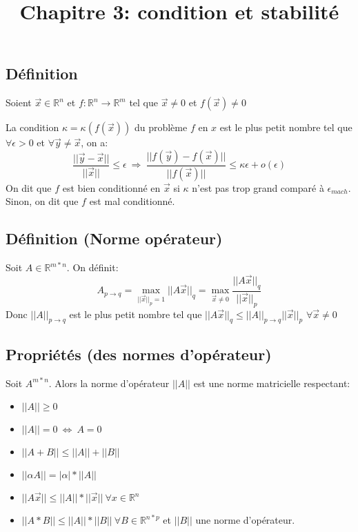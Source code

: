 \documentclass{article}
\title{Chapitre 3: condition et stabilité}
\newcommand{\R}{\mathbb{R}}
\newcommand{\y}{\vec{y}}
\newcommand{\x}{\vec{x}}
\begin{document}
\maketitle

\section{}
\section{}
\section{}

\subsection{Définition}
Soient $\x \in {\R}^{n}$ et $f: {\R}^n \rightarrow {\R}^m$ tel que $\x \neq 0$ et $f(\x) \neq 0$

La condition $\kappa = \kappa (f(\x))$ du problème $f$ en $x$ est le plus petit nombre tel que $\forall \epsilon > 0$ et $\forall \y \neq \x$, on a:
$$\frac{||\y - \x||}{||\x||} \leq \epsilon \ \Rightarrow \ \frac{||f(\y) - f(\x)||}{||f(\x)||} \leq \kappa \epsilon + o(\epsilon)$$
On dit que $f$ est bien conditionné en $\x$ si $\kappa$ n'est pas trop grand comparé à $\epsilon_{mach}$. Sinon, on dit que $f$ est mal conditionné.

\subsection{}

\subsection{Définition (Norme opérateur)}
Soit $A \in {\R}^{m * n}$. On définit:
$$A_{p \rightarrow q} = \max_{||\x||_p = 1}||A\x||_q = \max_{\x \neq 0}\frac{||A\x||_q}{||\x||_p}$$
Donc $||A||_{p \rightarrow q}$ est le plus petit nombre tel que $||A\x||_q \leq ||A||_{p \rightarrow q} ||\x||_p$ $\forall \x \neq 0$

\subsection{Propriétés (des normes d'opérateur)}
Soit $A^{m*n}$. Alors la norme d'opérateur $||A||$ est une norme matricielle respectant:
\begin{itemize}
    \item $||A|| \geq 0$
    \item $||A|| = 0 \ \Leftrightarrow \ A=0$
    \item $||A + B|| \leq ||A|| + ||B||$
    \item $||\alpha A|| = |\alpha|*||A||$
    \item $||A\x|| \leq ||A||* ||\x||\ \forall x \in {\R}^n$
    \item $||A*B|| \leq ||A|| * ||B||\ \forall B \in {\R}^{n * p}$ et $||B||$ une norme d'opérateur.
\end{itemize}
\end{document}
